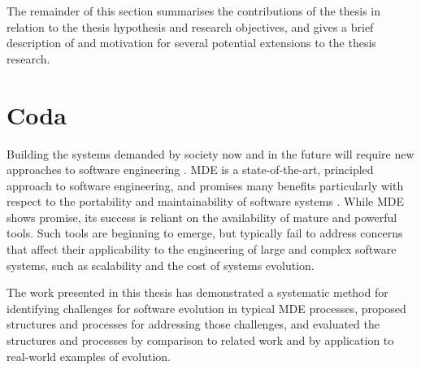 The remainder of this section summarises the contributions of the thesis in relation to the thesis hypothesis and research objectives, and gives a brief description of and motivation for several potential extensions to the thesis research.






\section{Coda}
Building the systems demanded by society now and in the future will require new approaches to software engineering \cite{selic03pragmatics}. MDE is a state-of-the-art, principled approach to software engineering, and promises many benefits particularly with respect to the portability and maintainability of software systems \cite{kleppe03mda,frankel02mda}. While MDE shows promise, its success is reliant on the availability of mature and powerful tools. Such tools are beginning to emerge, but typically fail to address concerns that affect their applicability to the engineering of large and complex software systems, such as scalability and the cost of systems evolution.

The work presented in this thesis has demonstrated a systematic method for identifying challenges for software evolution in typical MDE processes, proposed structures and processes for addressing those challenges, and evaluated the structures and processes by comparison to related work and by application to real-world examples of evolution.